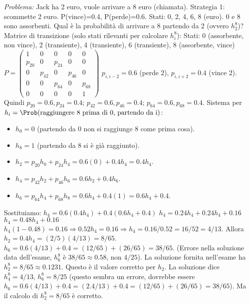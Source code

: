 \begin{example}
\textit{Problema:} Jack ha 2 euro, vuole arrivare a 8 euro (chiamata). Strategia 1: scommette 2 euro. P(vince)=0.4, P(perde)=0.6. Stati: 0, 2, 4, 6, 8 (euro). 0 e 8 sono assorbenti.
Qual è la probabilità di arrivare a 8 partendo da 2 (ovvero $h_2^8$)?
Matrice di transizione (solo stati rilevanti per calcolare $h_i^8$):
Stati: 0 (assorbente, non vince), 2 (transiente), 4 (transiente), 6 (transiente), 8 (assorbente, vince)
$P = \begin{pmatrix}
1 & 0 & 0 & 0 & 0 \\ %
p_{20} & 0 & p_{24} & 0 & 0 \\ %
0 & p_{42} & 0 & p_{46} & 0 \\ %
0 & 0 & p_{64} & 0 & p_{68} \\ %
0 & 0 & 0 & 0 & 1    %
\end{pmatrix}$
$p_{i, i-2} = 0.6$ (perde 2), $p_{i, i+2} = 0.4$ (vince 2).
Quindi $p_{20}=0.6, p_{24}=0.4$; $p_{42}=0.6, p_{46}=0.4$; $p_{64}=0.6, p_{68}=0.4$.
Sistema per $h_i = \Prob(\text{raggiungere 8 prima di 0, partendo da i})$:
\begin{itemize}
    \item $h_0 = 0$ (partendo da 0 non si raggiunge 8 come prima cosa).
    \item $h_8 = 1$ (partendo da 8 si è già raggiunto).
    \item $h_2 = p_{20}h_0 + p_{24}h_4 = 0.6(0) + 0.4h_4 = 0.4h_4$.
    \item $h_4 = p_{42}h_2 + p_{46}h_6 = 0.6h_2 + 0.4h_6$.
    \item $h_6 = p_{64}h_4 + p_{68}h_8 = 0.6h_4 + 0.4(1) = 0.6h_4 + 0.4$.
\end{itemize}
Sostituiamo:
$h_4 = 0.6(0.4h_4) + 0.4(0.6h_4 + 0.4)$
$h_4 = 0.24h_4 + 0.24h_4 + 0.16$
$h_4 = 0.48h_4 + 0.16$
$h_4(1 - 0.48) = 0.16 \Rightarrow 0.52h_4 = 0.16 \Rightarrow h_4 = 0.16/0.52 = 16/52 = 4/13$.
Allora $h_2 = 0.4 h_4 = (2/5)(4/13) = 8/65$.
$h_6 = 0.6(4/13) + 0.4 = (12/65) + (26/65) = 38/65$. (Errore nella soluzione data dell'esame, $h_6^8$ è $38/65 \approx 0.58$, non $4/25$).
La soluzione fornita nell'esame ha $h_2^8 = 8/65 \approx 0.1231$. Questo è il valore corretto per $h_2$.
La soluzione dice $h_4^8 = 4/13$, $h_6^8 = 8/25$ (questo sembra un errore, dovrebbe essere $h_6 = 0.6(4/13)+0.4 = (2.4/13)+0.4 = (12/65) + (26/65) = 38/65$).
Ma il calcolo di $h_2^8=8/65$ è corretto.


\end{example}
